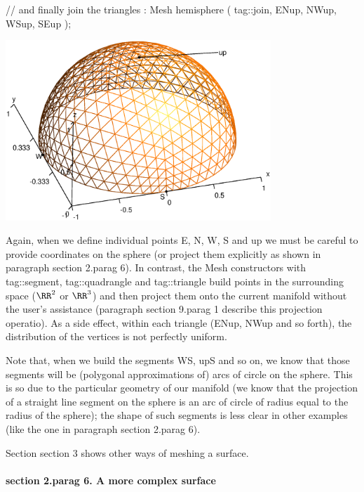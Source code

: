    // and finally join the triangles :
   Mesh hemisphere ( tag::join, ENup, NWup, WSup, SEup );
\endverbatim

{ 
\centerline{\includegraphics[width=10cm]{hemisphere.eps}} }

Again, when we define individual points {\codett E}, {\codett N}, {\codett W}, {\codett S} and
{\codett up} we must be careful to provide coordinates on the {\codett sphere}
(or {\codett project} them explicitly as shown in paragraph \numb section 2.\numb parag 6).
In contrast, the {\codett Mesh} constructors with {\codett tag::segment}, {\codett tag::quadrangle}
and {\codett tag::triangle} build points in the surrounding space ($ \RR^2 $ or $ \RR^3 $) and
then project them onto the current manifold without the user's assistance (paragraph
\numb section 9.\numb parag 1 describe this projection operatio).
As a side effect, within each triangle ({\codett ENup}, {\codett NWup} and so forth),
the distribution of the vertices is not perfectly uniform.

Note that, when we build the segments {\codett WS}, {\codett upS} and so on,
we know that those segments will be (polygonal approximations of) arcs of circle on the sphere.
This is so due to the particular geometry of our manifold (we know that the projection of
a straight line segment on the sphere is an arc of circle of radius equal to the radius of
the sphere); the shape of such segments is less clear in other examples
(like the one in paragraph \numb section 2.\numb parag 6).

Section \numb section 3 shows other ways of meshing a surface.


\paragraph{\numb section 2.\numb parag 6. A more complex surface}

